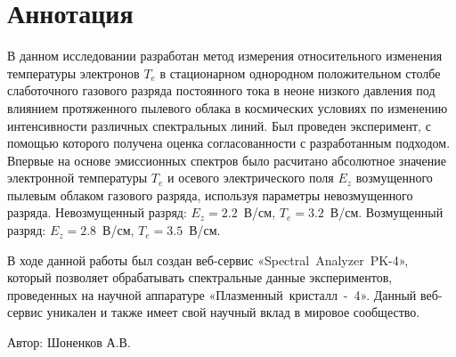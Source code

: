 \chapter*{Аннотация}

В данном исследовании разработан метод измерения относительного изменения температуры электронов $T_e$
в стационарном однородном положительном столбе слаботочного газового разряда
постоянного тока в неоне низкого давления под влиянием протяженного пылевого
облака в космических условиях по изменению интенсивности различных спектральных линий.
Был проведен эксперимент, с помощью которого получена оценка согласованности с разработанным подходом.
Впервые на основе эмиссионных спектров было расчитано абсолютное значение электронной температуры $T_e$ и осевого
электрического поля $E_z$ возмущенного пылевым облаком газового разряда, используя параметры невозмущенного разряда.
Невозмущенный разряд: $E_z = 2.2$~В/см, $T_e = 3.2$~В/см.
Возмущенный разряд: $E_z = 2.8$~В/см, $T_e = 3.5$~В/см.

В ходе данной работы был создан веб-сервис «Spectral~Analyzer~PK-4», который позволяет обрабатывать
спектральные данные экспериментов, проведенных на научной аппаратуре «Плазменный~кристалл~-~4». Данный веб-сервис
уникален и также имеет свой научный вклад в мировое сообщество.

\vfill
\vfill
\begin{minipage}{.49\textwidth}\end{minipage}
\hfill
\begin{minipage}{.49\textwidth}
    Автор: \uline{\hfill} Шоненков А.В.
\end{minipage}
\vfill
